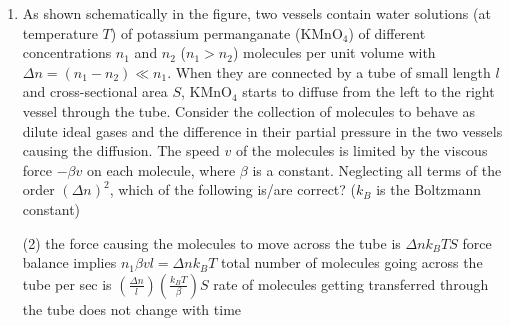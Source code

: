 
\begin{enumerate}
    \item As shown schematically in the figure, two vessels contain water solutions (at temperature \( T \)) of potassium permanganate (KMnO\(_4\)) of different concentrations \( n_1 \) and \( n_2 \) (\( n_1 > n_2 \)) molecules per unit volume with \( \Delta n = (n_1 - n_2) \ll n_1 \). When they are connected by a tube of small length \( l \) and cross-sectional area \( S \), KMnO\(_4\) starts to diffuse from the left to the right vessel through the tube. Consider the collection of molecules to behave as dilute ideal gases and the difference in their partial pressure in the two vessels causing the diffusion. The speed \( v \) of the molecules is limited by the viscous force \( -\beta v \) on each molecule, where \( \beta \) is a constant. Neglecting all terms of the order \( (\Delta n)^2 \), which of the following is/are correct? (\( k_B \) is the Boltzmann constant)
        \begin{tasks}(2)
            \task the force causing the molecules to move across the tube is \( \Delta nk_BTS \)
            \task force balance implies \( n_1\beta vl = \Delta nk_BT \)
            \task total number of molecules going across the tube per sec is \( \left(\frac{\Delta n}{l}\right) \left(\frac{k_BT}{\beta}\right) S \)
            \task rate of molecules getting transferred through the tube does not change with time
        \end{tasks}
\end{enumerate}

\begin{center}
\end{center}
